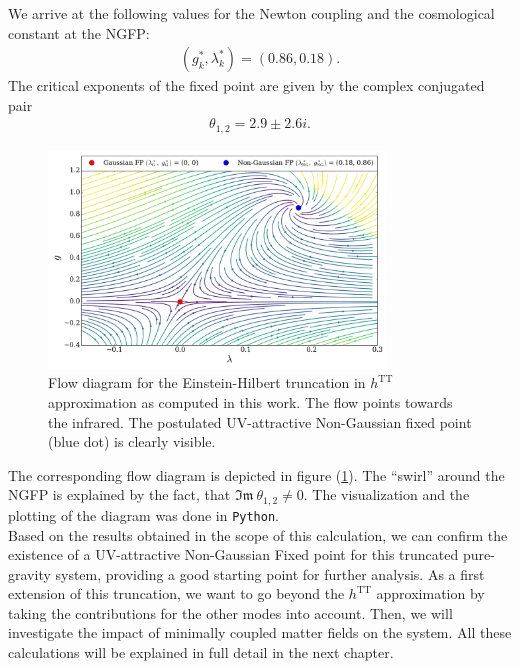 We arrive at the following values for the Newton coupling and the cosmological constant at the NGFP:
\begin{align}
	(g_k^*, \lambda_k^*) = (0.86, 0.18).
\end{align}
The critical exponents of the fixed point are given by the complex conjugated pair
\begin{align}
	\theta_{1,2} = 2.9 \pm 2.6i. 
\end{align}
\begin{figure}[t]
\centering
	\includegraphics[width=0.8\textwidth]{figs/Plots/EH_NoMatter}
	\caption[Flow diagram for the Einstein-Hilbert truncation in $h^{\mathrm{TT}}$ approximation]{Flow diagram  for the Einstein-Hilbert truncation in $h^{\mathrm{TT}}$ approximation as computed in this work. The flow points towards the infrared. The postulated UV-attractive Non-Gaussian fixed point (blue dot) is clearly visible. }
	\label{fig:flow_diag}
\hrulefill	
\end{figure}
The corresponding flow diagram is depicted in figure  (\ref{fig:flow_diag}). The \enquote{swirl} around the NGFP is explained by the fact, that $\mathfrak{Im}\ \theta_{1,2} \neq 0$. The visualization and the plotting of the diagram was done in \verb|Python|.\\
Based on the results obtained in the scope of this calculation, we can confirm the existence of a UV-attractive Non-Gaussian Fixed point for this truncated pure-gravity system, providing a good starting point for further analysis. As a first extension of this truncation, we want to go beyond the $h^{\mathrm{TT}}$ approximation by taking the contributions for the other modes into account. Then, we will investigate the impact of minimally coupled matter fields on the system. All these calculations will be explained in full detail in the next chapter. 